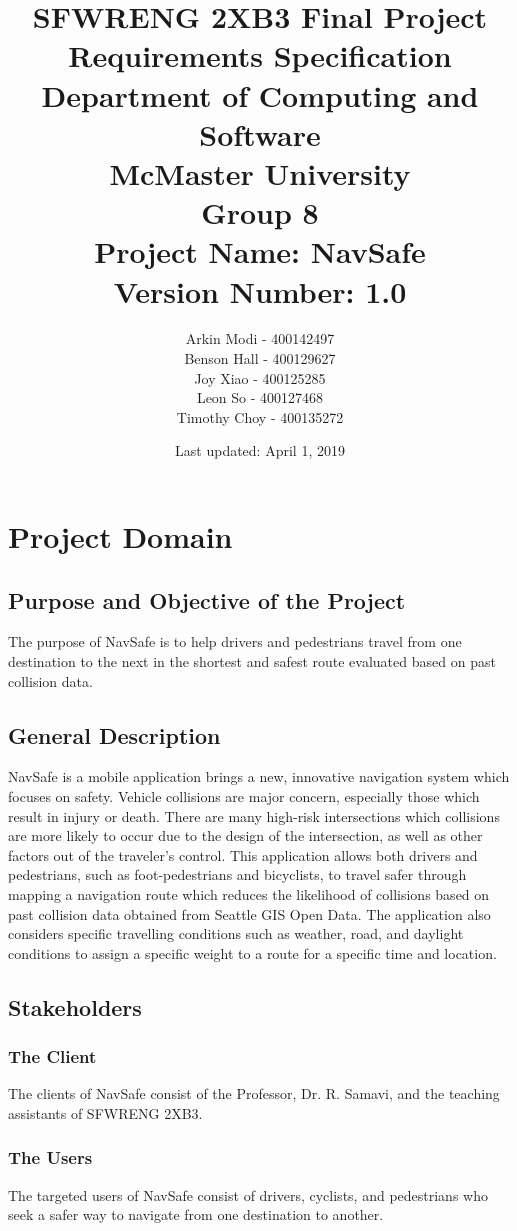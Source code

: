\documentclass[12pt]{article}
\title{
    SFWRENG 2XB3 Final Project \\
    \large Requirements Specification\\
    \vspace{1ex}
    \large Department of Computing and Software\\
    \large McMaster University\\
    \vspace{1ex}
    \large Group 8\\
    \large Project Name: NavSafe\\
    \large Version Number: 1.0
}
\author{
    Arkin Modi - 400142497\\
    Benson Hall - 400129627\\
    Joy Xiao - 400125285\\
    Leon So - 400127468\\
    Timothy Choy - 400135272
}
\date{Last updated: April 1, 2019}
\begin{document}
\maketitle
\newpage
\tableofcontents
\newpage

\section{Project Domain}
\subsection{Purpose and Objective of the Project}
The purpose of NavSafe is to help drivers and pedestrians travel from one destination to the next in the shortest and safest route evaluated based on past collision data. 

\subsection{General Description}
NavSafe is a mobile application brings a new, innovative navigation system which focuses on safety. Vehicle collisions are major concern, especially those which result in injury or death. There are many high-risk intersections which collisions are more likely to occur due to the design of the intersection, as well as other factors out of the traveler’s control. This application allows both drivers and pedestrians, such as foot-pedestrians and bicyclists, to travel safer through mapping a navigation route which reduces the likelihood of collisions based on past collision data obtained from Seattle GIS Open Data. The application also considers specific travelling conditions such as weather, road, and daylight conditions to assign a specific weight to a route for a specific time and location.

\subsection{Stakeholders}

    \subsubsection{The Client}
    The clients of NavSafe consist of the Professor, Dr. R. Samavi, and the teaching assistants of SFWRENG 2XB3.
    
    \subsubsection{The Users}
    The targeted users of NavSafe consist of drivers, cyclists, and pedestrians who seek a safer way to navigate from one destination to another.
    
\end{document}
